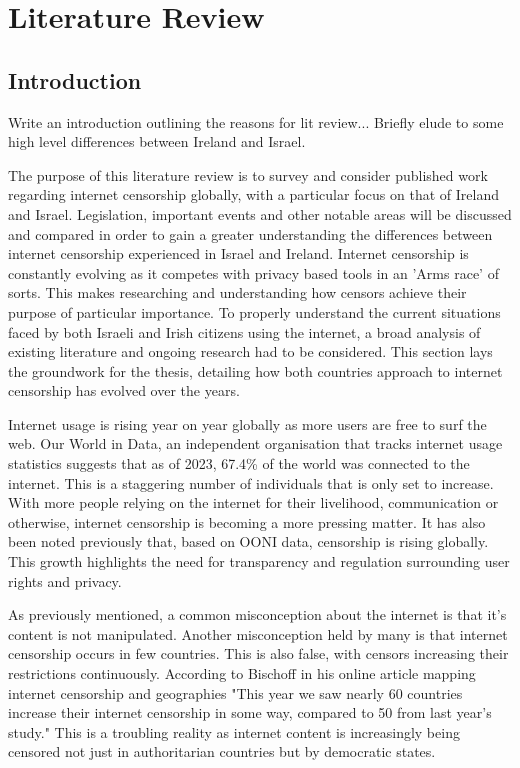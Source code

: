 \chapter{Literature Review}

\section{Introduction}

Write an introduction outlining the reasons for lit review... Briefly elude to some high level differences between Ireland and Israel.

The purpose of this literature review is to survey and consider published work regarding internet censorship globally, with a particular focus on that of Ireland and Israel. Legislation, important events and other notable areas will be discussed and compared in order to gain a greater understanding the differences between internet censorship experienced in Israel and Ireland. Internet censorship is constantly evolving as it competes with privacy based tools in an 'Arms race' of sorts. This makes researching and understanding how censors achieve their purpose of particular importance. To properly understand the current situations faced by both Israeli and Irish citizens using the internet, a broad analysis of existing literature and ongoing research had to be considered. This section lays the groundwork for the thesis, detailing how both countries approach to internet censorship has evolved over the years. 

Internet usage is rising year on year globally as more users are free to surf the web. Our World in Data, an independent organisation that tracks internet usage statistics suggests that as of 2023, 67.4\% of the world was connected to the internet. \cite{owid-internet} This is a staggering number of individuals that is only set to increase. With more people relying on the internet for their livelihood, communication or otherwise, internet censorship is becoming a more pressing matter. It has also been noted previously that, based on OONI data, censorship is rising globally. This growth highlights the need for transparency and regulation surrounding user rights and privacy. 

As previously mentioned, a common misconception about the internet is that it's content is not manipulated. Another misconception held by many is that internet censorship occurs in few countries. This is also false, with censors increasing their restrictions continuously. According to Bischoff in his online article mapping internet censorship and geographies "This year we saw nearly 60 countries increase their internet censorship in some way, compared to 50 from last year’s study."\cite{bischoff2025internet} This is a troubling reality as internet content is increasingly being censored not just in authoritarian countries but by democratic states. 

